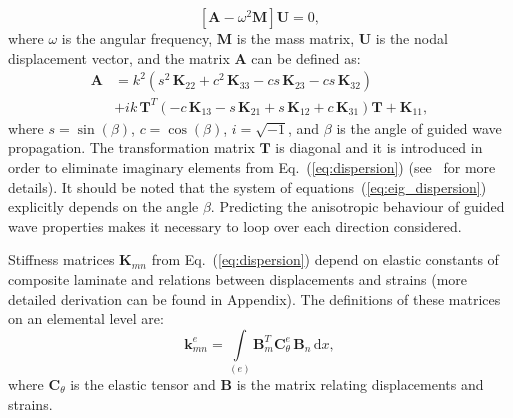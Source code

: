 \documentclass[preprint,12pt]{elsarticle}
\newcommand{\matr}[1]{\mathbf{#1}} %
\newcommand{\vect}[1]{\mathbf{#1}} %
\newcommand{\ud}{\mathrm{d}}
\begin{document}
	\begin{equation}
	\left[\matr{A} - \omega^2\matr{M} \right] \vect{U} =0,
	\label{eq:eig_dispersion}
	\end{equation}
	where \(\omega\) is the angular frequency, \(\matr{M}\) is the mass matrix, 
	\(\matr{U}\) is the nodal displacement vector, and the matrix \(\matr{A}\) can be 
	defined as:
	\begin{equation}
	\begin{aligned}
	\matr{A} & =  k^2\left(s^2 \,\matr{K}_{22} + c^2\, \matr{K}_{33} - c s \, \matr{K}_{23} - c s\, \matr{K}_{32}\right) \\
	& + i k\, \matr{T}^T\left(-c\, \matr{K}_{13} - s \, \matr{K}_{21} + s \, \matr{K}_{12} + c \, \matr{K}_{31}\right) \matr{T} +\matr{K}_{11},
	\end{aligned}
	\label{eq:dispersion}
	\end{equation}
where  \(s = \sin(\beta)\), \(c = \cos(\beta)\), \(i = \sqrt{-1}\), and \(\beta\) is the angle of guided wave propagation. 
The transformation matrix \(\matr{T}\) is diagonal and it is introduced in order to eliminate imaginary elements from Eq.~(\ref{eq:dispersion}) (see~\cite{Bartoli2006} for more details). 
It should be noted that the system of equations~(\ref{eq:eig_dispersion}) explicitly depends on the angle \(\beta\). 
Predicting the anisotropic behaviour of guided wave properties makes it necessary to loop over each direction considered.
	
Stiffness matrices \(\matr{K}_{mn}\) from Eq.~(\ref{eq:dispersion}) depend on elastic constants of composite laminate and relations between displacements and strains (more detailed derivation can be found in Appendix). 
The definitions of these matrices on an elemental level are:
	\begin{equation}
	\matr{k}_{mn}^e= \int \limits_{(e)} \matr{B}_m^{T} \matr{C}_{\theta}^e \, \matr{B}_n\, \ud x, 
	\label{eq:stiffness_matrix_e}
	\end{equation}
where \(\matr{C}_{\theta}\) is the elastic tensor and \(\matr{B}\) is the matrix relating displacements and strains.
	
\end{document}
